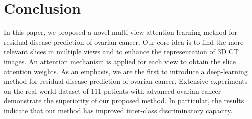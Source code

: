 \section{Conclusion}
\label{s:conclusion}

In this paper, we proposed a novel multi-view attention learning method for residual disease prediction of ovarian cancer. Our core idea is to find the more relevant slices in multiple views and to enhance the representation of 3D CT images.
An attention mechanism is applied for each view to obtain the slice attention weights.
As an emphasis, we are the first to introduce a deep-learning method for residual disease prediction of ovarian cancer.
Extensive experiments on the real-world dataset of 111 patients with advanced ovarian cancer demonstrate the superiority of our proposed method.
In particular, the results indicate that our method has improved inter-class discriminatory capacity.

